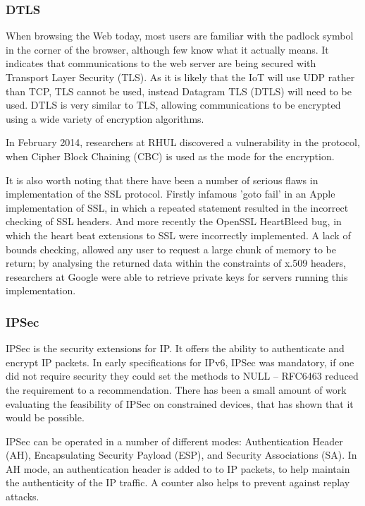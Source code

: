 \documentclass[10pt,journal,compsoc]{IEEEtran}
\begin{document}
\subsubsection{DTLS}
When browsing the Web today, most users are familiar with the padlock symbol in
the corner of the browser, although few know what it actually means. It
indicates that communications to the web server are being secured with
Transport Layer Security (TLS). As it is likely that the IoT will use UDP
rather than TCP, TLS cannot be used, instead Datagram TLS (DTLS) will need to
be used. DTLS is very similar to TLS, allowing communications to be encrypted
using a wide variety of encryption algorithms.  

In February 2014, researchers at RHUL discovered a vulnerability in the
protocol, when Cipher Block Chaining (CBC) is used as the mode for the
encryption. 

It is also worth noting that there have been a number of serious flaws in
implementation of the SSL protocol. Firstly infamous 'goto fail' in an Apple
implementation of SSL, in which a repeated statement resulted in the incorrect
checking of SSL headers. And more recently the OpenSSL HeartBleed bug, in
which the heart beat extensions to SSL were incorrectly implemented. A lack of
bounds checking, allowed any user to request a large chunk of memory to be
return; by analysing the returned data within the constraints of x.509 headers,
researchers at Google were able to retrieve private keys for servers running
this implementation. 

\subsubsection{IPSec}
IPSec is the security extensions for IP. It offers the ability to authenticate
and encrypt IP packets. In early specifications for IPv6, IPSec was mandatory,
if one did not require security they could set the methods to NULL -- RFC6463
reduced the requirement to a recommendation. There has been a small amount
of work evaluating the feasibility of IPSec on constrained devices, that
has shown that it would be possible. 

IPSec can be operated in a number of different modes: Authentication Header
(AH), Encapsulating Security Payload (ESP), and Security Associations (SA).
In AH mode, an authentication header is added to to IP packets, to help
maintain the authenticity of the IP traffic. A counter also helps to prevent
against replay attacks. 
\end{document}
